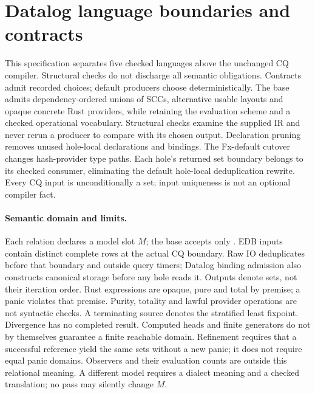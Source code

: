 \section{Datalog language boundaries and contracts}
\label{sec:datalog-languages}
This specification separates five checked languages above the unchanged CQ
compiler. Structural checks do not discharge all semantic obligations.
Contracts admit recorded choices; default producers choose deterministically.
The base admits dependency-ordered unions of SCCs, alternative usable layouts
and opaque concrete Rust providers, while retaining the
 evaluation scheme and a checked operational vocabulary.
Structural checks examine the supplied IR and never rerun a producer to compare
with its chosen output.
Declaration pruning removes unused hole-local declarations and bindings.
The Fx-default cutover changes hash-provider type paths. Each hole's returned
set boundary belongs to its checked consumer, eliminating the default
hole-local deduplication rewrite. Every CQ input is unconditionally a set;
input uniqueness is not an optional compiler fact.

\paragraph{Semantic domain and limits.}
Each relation declares a model slot $M$; the base accepts only .
EDB inputs contain distinct complete rows at the actual CQ boundary. Raw IO
deduplicates before that boundary and outside query timers; Datalog binding
admission also constructs canonical storage before any hole reads it.
Outputs denote sets, not their iteration order. Rust expressions are opaque,
pure and total by premise; a panic violates that premise. Purity, totality and
lawful provider operations are not syntactic checks. A terminating
source denotes the stratified least fixpoint. Divergence has no
completed result. Computed heads and finite generators do not by themselves
guarantee a finite reachable domain. Refinement requires that a successful
reference yield the same sets without a new panic; it does not require equal
panic domains. Observers and their evaluation counts are outside this relational
meaning. A different model requires a dialect meaning and a checked translation;
no pass may silently change $M$.

